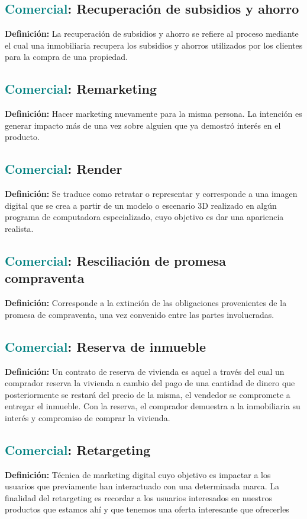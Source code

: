 \documentclass[12pt]{article}
\begin{document}
\subsection{\textcolor{teal}{Comercial}: Recuperación de subsidios y ahorro}
\textbf{Definición:} La recuperación de subsidios y ahorro se refiere al proceso mediante el cual una inmobiliaria recupera los subsidios y ahorros utilizados por los clientes para la compra de una propiedad. 
\subsection{\textcolor{teal}{Comercial}: Remarketing}
\textbf{Definición:} Hacer marketing nuevamente para la misma persona. La intención es generar impacto más de una vez sobre alguien que ya demostró interés en el producto.
\subsection{\textcolor{teal}{Comercial}: Render}
\textbf{Definición:} Se traduce como retratar o representar y corresponde a una imagen digital que se crea a partir de un modelo o escenario 3D realizado en algún programa de computadora especializado, cuyo objetivo es dar una apariencia realista.
\subsection{\textcolor{teal}{Comercial}: Resciliación de promesa compraventa}
\textbf{Definición:} Corresponde a la extinción de las obligaciones provenientes de la promesa de compraventa, una vez convenido entre las partes involucradas.
\subsection{\textcolor{teal}{Comercial}: Reserva de inmueble}
\textbf{Definición:} Un contrato de reserva de vivienda es aquel a través del cual un comprador reserva la vivienda a cambio del pago de una cantidad de dinero que posteriormente se restará del precio de la misma, el vendedor se compromete a entregar el inmueble. Con la reserva, el comprador demuestra a la inmobiliaria su interés y compromiso de comprar la vivienda.
\subsection{\textcolor{teal}{Comercial}: Retargeting}
\textbf{Definición:} Técnica de marketing digital cuyo objetivo es impactar a los usuarios que previamente han interactuado con una determinada marca. La finalidad del retargeting es recordar a los usuarios interesados en nuestros productos que estamos ahí y que tenemos una oferta interesante que ofrecerles
\end{document}
